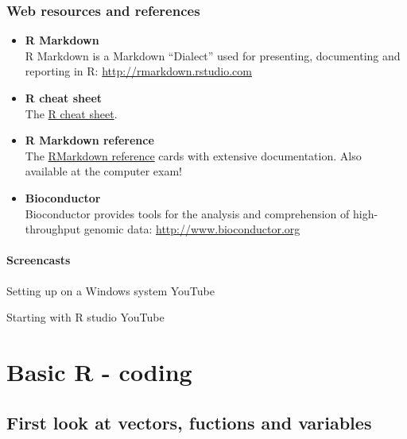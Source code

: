 \documentclass[]{book}
\begin{document}
\hypertarget{web-resources-and-references}{%
\subsection*{Web resources and references}\label{web-resources-and-references}}

\begin{itemize}
\item
  \textbf{R Markdown}\\
  R Markdown is a Markdown ``Dialect'' used for presenting, documenting and reporting in R: \href{http://rmarkdown.rstudio.com/}{http://rmarkdown.rstudio.com}
\item
  \textbf{R cheat sheet}\\
  The \href{figures/R_cheatsheet.pdf}{R cheat sheet}.
\item
  \textbf{R Markdown reference}\\
  The \href{https://www.rstudio.com/wp-content/uploads/2015/03/rmarkdown-reference.pdf}{RMarkdown reference} cards with extensive documentation. Also available at the computer exam!
\item
  \textbf{Bioconductor}\\
  Bioconductor provides tools for the analysis and comprehension of high- throughput genomic data: \href{http://www.bioconductor.org/}{http://www.bioconductor.org}
\end{itemize}

\hypertarget{screencasts}{%
\subsubsection*{Screencasts}\label{screencasts}}

Setting up on a Windows system
YouTube

Starting with R studio
YouTube

\hypertarget{basic-r---coding}{%
\chapter{Basic R - coding}\label{basic-r---coding}}

\hypertarget{first-look-at-vectors-fuctions-and-variables}{%
\section{First look at vectors, fuctions and variables}\label{first-look-at-vectors-fuctions-and-variables}}
\end{document}
